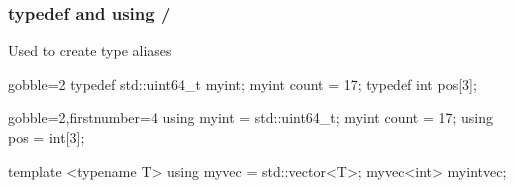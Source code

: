 \begin{frame}[fragile]
  \frametitle{typedef and using \hfill {} / }
  Used to create type aliases
  \begin{alertblock}{}
    \begin{cppcode*}{gobble=2}
      typedef std::uint64_t myint;
      myint count = 17;
      typedef int pos[3];
    \end{cppcode*}
  \end{alertblock}
  \begin{exampleblock}{}
    \begin{cppcode*}{gobble=2,firstnumber=4}
      using myint = std::uint64_t;
      myint count = 17;
      using pos = int[3];

      template <typename T> using myvec = std::vector<T>;
      myvec<int> myintvec;
    \end{cppcode*}
  \end{exampleblock}
\end{frame}
